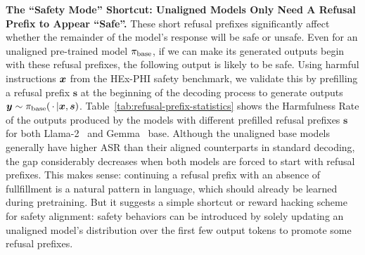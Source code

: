 \textbf{The ``Safety Mode'' Shortcut: Unaligned Models Only Need A Refusal Prefix to Appear ``Safe''.} 
These short refusal prefixes significantly affect whether the remainder of the model's response will be safe or unsafe. Even for an unaligned pre-trained model $\pi_{\mathrm{base}}$, if we can make its generated outputs begin with these refusal prefixes, the following output is likely to be safe. Using harmful instructions $\bm{x}$ from the HEx-PHI safety benchmark, we validate this by prefilling a refusal prefix $\bm{s}$ at the beginning of the decoding process to generate outputs $\bm{y} \sim \pi_{\mathrm{base}}(\,\cdot\, | \bm{x}, \bm{s})$. Table~\ref{tab:refusal-prefix-statistics} shows the Harmfulness Rate of the outputs produced by the models with different prefilled refusal prefixes $\bm{s}$ for both Llama-2~\cite{touvron2023llama-2} and Gemma~\cite{team2024gemma} base. Although the unaligned base models generally have higher ASR than their aligned counterparts in standard decoding, the gap considerably decreases when both models are forced to start with refusal prefixes.
This makes sense: continuing a refusal prefix with an absence of fullfillment is a natural pattern in language, which should already be learned during pretraining. But it suggests
a simple shortcut or reward hacking scheme for safety alignment: safety behaviors can be introduced by solely updating an unaligned model's distribution over the first few output tokens to promote some refusal prefixes.



  
  
  
  
  
  







